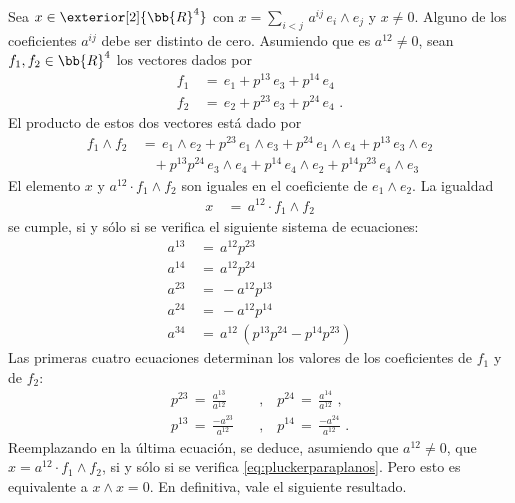 Sea $x\in\exterior[2]{\bb{R}^{4}}$ con $x=\sum_{i<j}\,%
a^{ij}\,e_{i}\wedge e_{j}$ y $x\not =0$. Alguno de los coeficientes
$a^{ij}$ debe ser distinto de cero. Asumiendo que es $a^{12}\not =0$,
sean $f_{1},f_{2}\in\bb{R}^{4}$ los vectores dados por
\begin{align*}
	f_{1} & \,=\, e_{1}+p^{13}\,e_{3}+p^{14}\,e_{4} \\
	f_{2} & \,=\, e_{2}+p^{23}\,e_{3}+p^{24}\,e_{4}
	\text{ .}
\end{align*}
%
El producto de estos dos vectores est\'{a} dado por
\begin{align*}
	f_{1}\wedge f_{2} & \,=\, e_{1}\wedge e_{2}+p^{23}\,e_{1}\wedge e_{3}
		+p^{24}\,e_{1}\wedge e_{4}+p^{13}\,e_{3}\wedge e_{2} \\
	& \quad +p^{13}p^{24}\,e_{3}\wedge e_{4}+p^{14}\,e_{4}\wedge e_{2}
		+p^{14}p^{23}\,e_{4}\wedge e_{3}
\end{align*}
%
El elemento $x$ y $a^{12}\cdot f_{1}\wedge f_{2}$ son iguales en el
coeficiente de $e_{1}\wedge e_{2}$. La igualdad
\begin{align*}
	x & \,=\, a^{12}\cdot f_{1}\wedge f_{2}
\end{align*}
%
se cumple, si y s\'{o}lo si se verifica el siguiente sistema de ecuaciones:
\begin{equation}
	\label{eq:tensorelemental}
	\begin{aligned}
		a^{13} & \,=\, a^{12}p^{23} \\
		a^{14} & \,=\, a^{12}p^{24} \\
		a^{23} & \,=\, -a^{12}p^{13} \\
		a^{24} & \,=\, -a^{12}p^{14} \\
		a^{34} & \,=\,a^{12}\,(p^{13}p^{24}-p^{14}p^{23})
	\end{aligned}
\end{equation}
%
Las primeras cuatro ecuaciones determinan los valores de los coeficientes
de $f_{1}$ y de $f_{2}$:
\begin{align*}
	p^{23} \,=\,\frac{a^{13}}{a^{12}} & \quad\text{,}\quad
		p^{24} \,=\,\frac{a^{14}}{a^{12}} \text{ ,} \\
	p^{13} \,=\,\frac{-a^{23}}{a^{12}} & \quad\text{,}\quad
		p^{14} \,=\,\frac{-a^{24}}{a^{12}}
	\text{ .}
\end{align*}
%
Reemplazando en la \'{u}ltima ecuaci\'{o}n, se deduce,
asumiendo que $a^{12}\not =0$, que $x=a^{12}\cdot f_{1}\wedge f_{2}$, si y
s\'{o}lo si se verifica \eqref{eq:pluckerparaplanos}. Pero esto es equivalente
a $x\wedge x=0$. En definitiva, vale el siguiente resultado.

